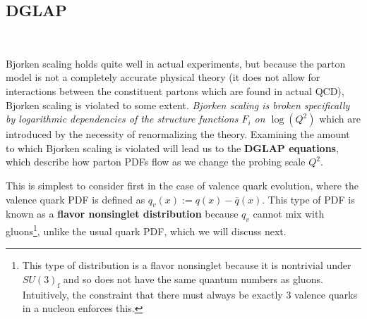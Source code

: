 \documentclass[11pt, oneside]{article}   	%
\theoremstyle{definition}
\begin{document}
\subsection{DGLAP}~
\label{ch:dglap}

Bjorken scaling holds quite well in actual experiments, but because the parton model is not a completely accurate physical theory (it does not 
allow for interactions between the constituent partons which are found in actual QCD), Bjorken scaling is violated to some extent. 
\textit{Bjorken scaling is broken specifically by logarithmic dependencies of the structure functions $F_i$ on $\log(Q^2)$} which are 
introduced by the necessity of renormalizing the theory. Examining the amount to which Bjorken scaling is violated will lead us to the 
\textbf{DGLAP equations}, which describe how parton PDFs flow as we change the probing scale $Q^2$. 

This is simplest to consider first in the case of valence quark evolution, where the valence quark PDF is defined as $q_v(x) := q(x) - \overline 
q(x)$. This type of PDF is known as a \textbf{flavor nonsinglet distribution} because $q_v$ cannot mix with gluons\footnote{This type of 
distribution is a flavor nonsinglet because it is nontrivial under $SU(3)_\mathrm{f}$ and so does not have the same quantum numbers 
as gluons. Intuitively, the constraint that there must always be exactly 3 valence quarks in a nucleon enforces this.}, unlike the usual quark 
PDF, which we will discuss next. 
\end{document}
